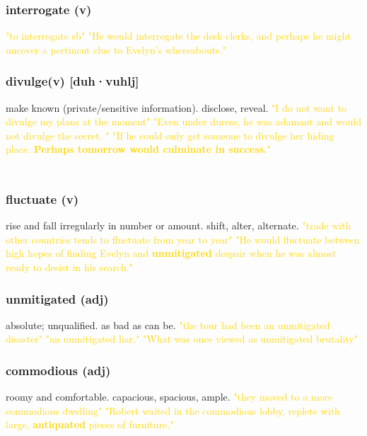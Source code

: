 \documentclass{proc}
\begin{document}
	\subsubsection{\textcolor{brickred}{interrogate} (v)}
	\textcolor{gold}{"to interrogate sb" "He  would interrogate the desk  clerks, and  perhaps he  might uncover a  pertinent clue to Evelyn's whereabouts."}
	
	\subsubsection{\textcolor{brickred}{divulge}(v) [duh·vuhlj]}
	make known (private/sensitive information). disclose, reveal.
	\textcolor{gold}{"I do not want to divulge my plans at the moment" "Even under duress, he was adamant and would not divulge the secret. " "If he could only get someone to divulge her hiding place. \textbf{Perhaps tomorrow would culminate in success.}"}\\\\
	
	\newpage
	\subsection{}
	\subsubsection{\textcolor{brickred}{fluctuate} (v)}
	rise and fall irregularly in number or amount. shift, alter, alternate.
	\textcolor{gold}{"trade with other countries tends to fluctuate from year to year" "He would fluctuate between high hopes of finding Evelyn and \textbf{unmitigated} despair when he was almost ready to desist in his  search."}
	
	\subsubsection{\textcolor{brickred}{unmitigated} (adj)}
	absolute; unqualified. as bad as can be.
	\textcolor{gold}{"the tour had been an unmitigated disaster" "an unmitigated liar." "What was once viewed as unmitigated brutality"}
	
	\subsubsection{\textcolor{brickred}{commodious} (adj)}
	roomy and comfortable. capacious,
	spacious, ample.
	\textcolor{gold}{"they moved to a more commodious dwelling" "Robert waited in the commodious lobby, replete with large, \textbf{antiquated} pieces of furniture."}
	
\end{document}
